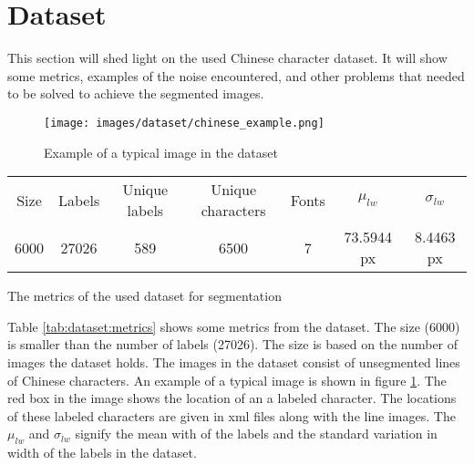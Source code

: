 \section{Dataset} %
\label{sec:dataset}

This section will shed light on the used Chinese character dataset. It will show some metrics, examples of the noise encountered, and other problems that needed to be solved to achieve the segmented images.

\begin{figure}[ht]
 \centering
\texttt{[image: images/dataset/chinese\_example.png]}
 \caption{Example of a typical image in the dataset}
 \label{fig:dataset:chinese:example}
\end{figure}

\bigskip

\begin{minipage}{\linewidth}
\flushleft
{} \label{tab:dataset:metrics} 
\begin{tabular}{ c c c c c c c}
\hline
\hline
Size		& Labels 	& Unique labels	& Unique characters	& Fonts & $\mu_{lw}$ & $\sigma_{lw}$\\
6000 		& 27026				  & 589						  & 6500					& 7       & 73.5944 px   & 8.4463 px\\
\hline
\end{tabular}\par
\bigskip
The metrics of the used dataset for segmentation
\end{minipage}

\bigskip

\noindent Table \ref{tab:dataset:metrics} shows some metrics from the dataset. The size (6000) is smaller than the number of labels (27026). The size is based on the number of images the dataset holds. The images in the dataset consist of unsegmented lines of Chinese characters. An example of a typical image is shown in figure \ref{fig:dataset:chinese:example}. The red box in the image shows the location of an a labeled character. The locations of these labeled characters are given in xml files along with the line images. The $\mu_{lw}$ and $\sigma_{lw}$ signify the mean with of the labels and the standard variation in width of the labels in the dataset.

